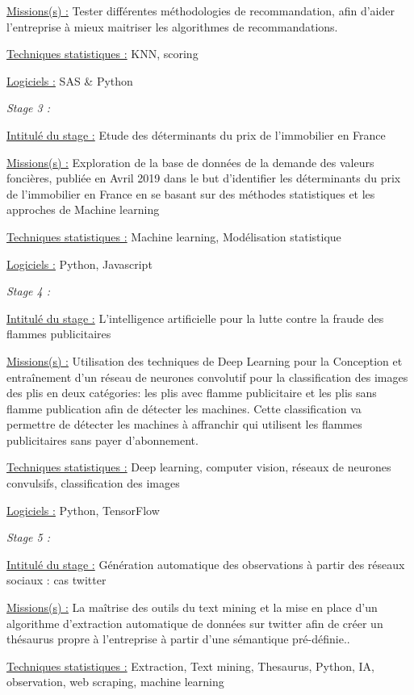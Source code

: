 \documentclass[
  letterpaper,
  DIV=11,
  numbers=noendperiod]{scrreprt}
\begin{document}
\uline{Missions(s) :} Tester différentes méthodologies de
recommandation, afin d'aider l'entreprise à mieux maitriser les
algorithmes de recommandations.

\uline{Techniques statistiques :} KNN, scoring

\uline{Logiciels :} SAS \& Python

\emph{Stage 3 :}

\uline{Intitulé du stage :} Etude des déterminants du prix de
l'immobilier en France

\uline{Missions(s) :} Exploration de la base de données de la demande
des valeurs foncières, publiée en Avril 2019 dans le but d'identifier
les déterminants du prix de l'immobilier en France en se basant sur des
méthodes statistiques et les approches de Machine learning

\uline{Techniques statistiques :} Machine learning, Modélisation
statistique

\uline{Logiciels :} Python, Javascript

\emph{Stage 4 :}

\uline{Intitulé du stage :} L'intelligence artificielle pour la lutte
contre la fraude des flammes publicitaires

\uline{Missions(s) :} Utilisation des techniques de Deep Learning pour
la Conception et entraînement d'un réseau de neurones convolutif pour la
classification des images des plis en deux catégories: les plis avec
flamme publicitaire et les plis sans flamme publication afin de détecter
les machines. Cette classification va permettre de détecter les machines
à affranchir qui utilisent les flammes publicitaires sans payer
d'abonnement.

\uline{Techniques statistiques :} Deep learning, computer vision,
réseaux de neurones convulsifs, classification des images

\uline{Logiciels :} Python, TensorFlow

\emph{Stage 5 :}

\uline{Intitulé du stage :} Génération automatique des observations à
partir des réseaux sociaux : cas twitter

\uline{Missions(s) :} La maîtrise des outils du text mining et la mise
en place d'un algorithme d'extraction automatique de données sur twitter
afin de créer un thésaurus propre à l'entreprise à partir d'une
sémantique pré-définie..

\uline{Techniques statistiques :} Extraction, Text mining, Thesaurus,
Python, IA, observation, web scraping, machine learning
\end{document}
